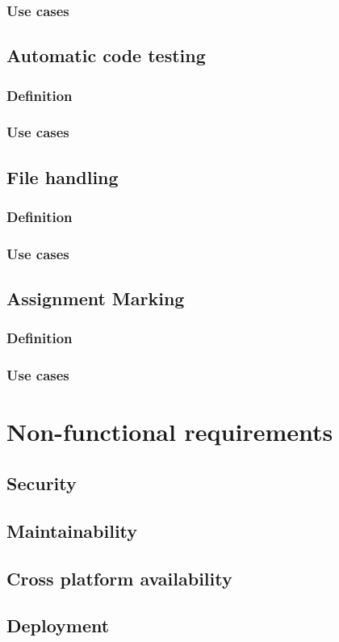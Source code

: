 \subsubsection{Use cases}

\subsection{Automatic code testing}
\subsubsection{Definition}
\subsubsection{Use cases}

\subsection{File handling}
\subsubsection{Definition}
\subsubsection{Use cases}

\subsection{Assignment Marking}
\subsubsection{Definition}
\subsubsection{Use cases}


\section{Non-functional requirements}
\subsection{Security}
\subsection{Maintainability}
\subsection{Cross platform availability}
\subsection{Deployment}